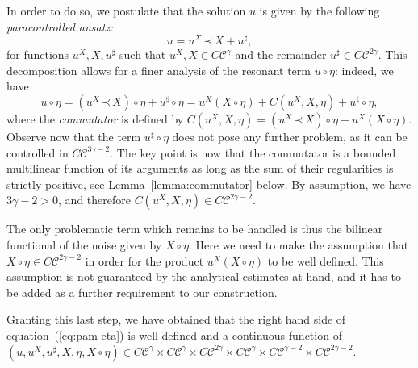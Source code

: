 \documentclass[a4paper,11pt]{article}
\newcommand{\tmem}[1]{{\em #1\/}}
\newcommand{\tmtextit}[1]{{\itshape{#1}}}
\newcommand{\CC}{\mathscr{C}}
\newcommand{\lpara}{\,\mathord{\prec}\,}
\newcommand{\reso}{\,\mathord{\circ}\,}
\begin{document}
In order to do so, we postulate that the solution $u$ is given by the
following \tmtextit{paracontrolled ansatz:}
\[ u = u^X \lpara X + u^{\sharp}, \]
for functions $u^X, X, u^{\sharp}$ such that $u^X, X \in C \CC^{\gamma}$ and the
remainder $u^{\sharp} \in C \CC^{2 \gamma}$. This decomposition allows for a
finer analysis of the resonant term $u \reso \eta$: indeed, we have
\begin{equation}
  \label{eq:rde expand resonant term} u \reso \eta = (u^X \lpara X) \reso \eta
  + u^{\sharp} \reso \eta = u^X  (X \reso \eta) + C (u^X, X, \eta) +
  u^{\sharp} \reso \eta,
\end{equation}
where the {\tmem{commutator}} is defined by $C (u^X, X, \eta) = (u^X \lpara X)
\reso \eta - u^X  (X \reso \eta)$. Observe now that the term $u^{\sharp} \reso
\eta$ does not pose any further problem, as it can be controlled in $C \CC^{3 \gamma
- 2}$. The key point is now that the commutator is a bounded multilinear
function of its arguments as long as the sum of their regularities is strictly
positive, see Lemma~\ref{lemma:commutator} below. By assumption, we have $3
\gamma - 2 > 0$, and therefore $C (u^X, X, \eta) \in C \CC^{2 \gamma - 2}$.

The only problematic term which remains to be handled is thus the bilinear
functional of the noise given by $X \reso \eta$. Here we need to make the
assumption that $X \reso \eta \in C \CC^{2 \gamma - 2}$ in order for the
product $u^X  (X \reso \eta)$ to be well defined. This assumption is not
guaranteed by the analytical estimates at hand, and it has to be added as a
further requirement to our construction.

Granting this last step, we have obtained that the right hand side of
equation~(\ref{eq:pam-eta}) is well defined and a continuous function of $(u,
u^X, u^{\sharp}, X, \eta, X \reso \eta) \in C\CC^\gamma \times C \CC^\gamma \times C \CC^{2\gamma} \times C \CC^\gamma \times C \CC^{\gamma-2} \times C \CC^{2\gamma-2}$.

\
\end{document}
